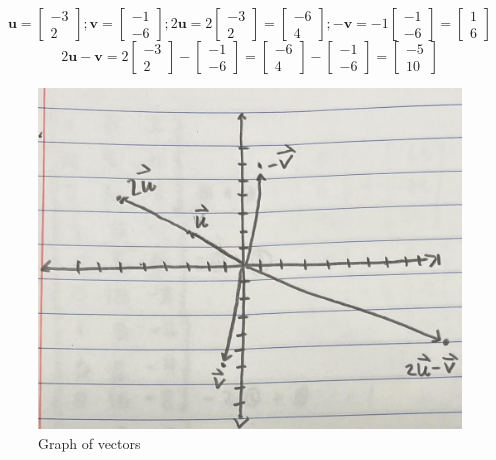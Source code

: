 \documentclass{report}
\begin{document}
\begin{equation*}
\textbf{u}
=
\begin{bmatrix}
-3 \\
2
\end{bmatrix}
;
\textbf{v}
=
\begin{bmatrix}
-1 \\
-6
\end{bmatrix}
;
2
\textbf{u}
=
2
\begin{bmatrix}
-3 \\
2
\end{bmatrix}
=
\begin{bmatrix}
-6 \\
4
\end{bmatrix}
;
-
\textbf{v}
=
-1
\begin{bmatrix}
-1 \\
-6
\end{bmatrix}
=
\begin{bmatrix}
1 \\
6
\end{bmatrix}
\end{equation*}
\begin{equation*}
2
\textbf{u}
-
\textbf{v}
=
2
\begin{bmatrix}
-3 \\
2
\end{bmatrix}
-
\begin{bmatrix}
-1 \\
-6
\end{bmatrix}
=
\begin{bmatrix}
-6 \\
4
\end{bmatrix}
-
\begin{bmatrix}
-1 \\
-6
\end{bmatrix}
=
\begin{bmatrix}
-5 \\
10
\end{bmatrix}
\end{equation*}
\begin{figure}[h]
  \includegraphics[width=\linewidth]{graph.jpg}
  \caption{Graph of vectors}
  \label{fig:graph1}
\end{figure}
\end{document}
